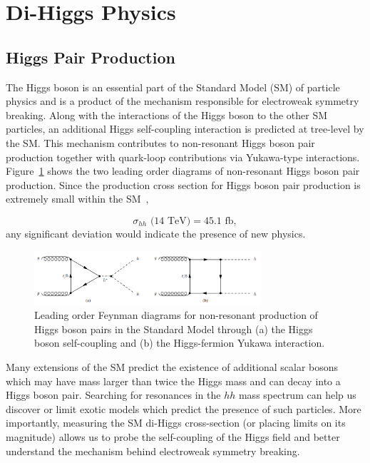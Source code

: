 \section{Di-Higgs Physics}
\subsection{Higgs Pair Production}
\label{sec:physics}

The Higgs boson is an essential part of the Standard Model (SM) of particle physics and is a product of the mechanism responsible for electroweak symmetry breaking. Along with the interactions of the Higgs boson to the other SM particles, an additional Higgs self-coupling interaction is predicted at tree-level by the SM. This mechanism contributes to non-resonant Higgs boson pair production together with quark-loop contributions via Yukawa-type interactions. Figure~\ref{fig:nr_hh_production} shows the two leading order diagrams of non-resonant Higgs boson pair production. Since the production cross section for Higgs boson pair production is extremely small within the SM~\cite{deFlorian:2016spz}, 

\begin{equation*}
\sigma_{hh}\text{ (14 TeV)} = 45.1 \text{ fb},
\end{equation*}
any significant deviation would indicate the presence of new physics.

\begin{figure}[!h] 
\begin{center}
\includegraphics*[width=0.75\textwidth] {dihiggsPhys/figures/nr-diHiggs-production.png}
\caption{Leading order Feynman diagrams for non-resonant production of Higgs
  boson pairs in the Standard Model through (a) the Higgs boson self-coupling
  and (b) the Higgs-fermion Yukawa interaction.} 
  \label{fig:nr_hh_production}
\end{center}
\end{figure}

Many extensions of the SM predict the existence of additional scalar bosons which may have mass larger than twice the Higgs mass and can decay into a Higgs boson pair. Searching for resonances in the $hh$ mass spectrum can help us discover or limit exotic models which predict the presence of such particles. More importantly, measuring the SM di-Higgs cross-section (or placing limits on its magnitude) allows us to probe the self-coupling of the Higgs field and better understand the mechanism behind electroweak symmetry breaking.

